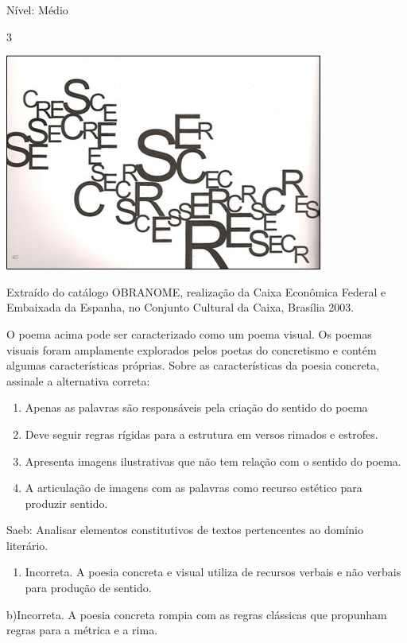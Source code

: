 {Nível: Médio

\num{3}

\includegraphics[width=4.11458in,height=2.80208in]{./imgSAEB_7_POR/media/image3.png}

Extraído do catálogo OBRANOME, realização da Caixa Econômica Federal e
Embaixada da Espanha, no Conjunto Cultural da Caixa, Brasília 2003.

O poema acima pode ser caracterizado como um poema visual. Os poemas
visuais foram amplamente explorados pelos poetas do concretismo e contém
algumas características próprias. Sobre as características da poesia
concreta, assinale a alternativa correta:

\begin{enumerate}
\def\labelenumi{\arabic{enumi}.}
\item
  Apenas as palavras são responsáveis pela criação do sentido do poema
\item
  Deve seguir regras rígidas para a estrutura em versos rimados e
  estrofes.
\item
  Apresenta imagens ilustrativas que não tem relação com o sentido do
  poema.
\item
  A articulação de imagens com as palavras como recurso estético para
  produzir sentido.
\end{enumerate}

Saeb: Analisar elementos constitutivos de textos pertencentes ao domínio
literário.

\begin{enumerate}
\def\labelenumi{\arabic{enumi}.}
\tightlist
\item
  Incorreta. A poesia concreta e visual utiliza de recursos verbais e
  não verbais para produção de sentido.
\end{enumerate}

b)Incorreta. A poesia concreta rompia com as regras clássicas que
propunham regras para a métrica e a rima.

}
